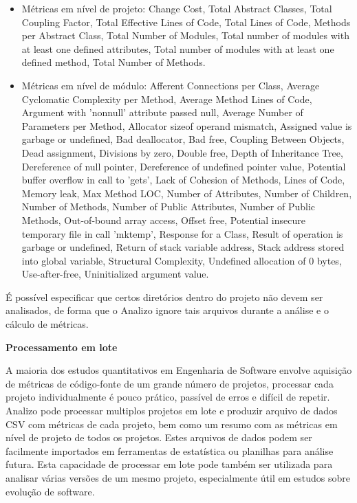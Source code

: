 \begin{itemize}

  \item Métricas em nível de projeto: Change Cost, Total Abstract Classes,
  Total Coupling Factor, Total Effective Lines of Code, Total Lines of Code,
  Methods per Abstract Class, Total Number of Modules, Total number of modules
  with at least one defined attributes, Total number of modules with at least
  one defined method, Total Number of Methods.

  \item Métricas em nível de módulo: Afferent Connections per Class, Average
  Cyclomatic Complexity per Method, Average Method Lines of Code, Argument with
  'nonnull' attribute passed null, Average Number of Parameters per Method,
  Allocator sizeof operand mismatch, Assigned value is garbage or undefined,
  Bad deallocator, Bad free, Coupling Between Objects, Dead assignment,
  Divisions by zero, Double free, Depth of Inheritance Tree, Dereference of
  null pointer, Dereference of undefined pointer value, Potential buffer
  overflow in call to 'gets', Lack of Cohesion of Methods, Lines of Code,
  Memory leak, Max Method LOC, Number of Attributes, Number of Children, Number
  of Methods, Number of Public Attributes, Number of Public Methods,
  Out-of-bound array access, Offset free, Potential insecure temporary file in
  call 'mktemp', Response for a Class, Result of operation is garbage or
  undefined, Return of stack variable address, Stack address stored into global
  variable, Structural Complexity, Undefined allocation of 0 bytes,
  Use-after-free, Uninitialized argument value.

\end{itemize}

É possível especificar que certos diretórios dentro do projeto não devem ser
analisados, de forma que o Analizo ignore tais arquivos durante a análise e o
cálculo de métricas.

{\bf Processamento em lote}\label{lote}

A maioria dos estudos quantitativos em Engenharia de Software envolve aquisição
de métricas de código-fonte de um grande número de projetos, processar cada
projeto individualmente é pouco prático, passível de erros e difícil de
repetir. Analizo pode processar multiplos projetos em lote e produzir arquivo
de dados CSV com métricas de cada projeto, bem como um resumo com as métricas
em nível de projeto de todos os projetos. Estes arquivos de dados podem ser
facilmente importados em ferramentas de estatística ou planilhas para análise
futura. Esta capacidade de processar em lote pode também ser utilizada para
analisar várias versões de um mesmo projeto, especialmente útil em estudos
sobre evolução de software.

